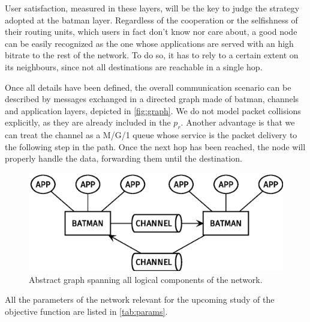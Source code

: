 \documentclass[conference,10.5pt]{IEEEtran}
\begin{document}
User satisfaction, measured in these layers, will be the key to judge the strategy adopted at the \gls{batman} layer.
Regardless of the cooperation or the selfishness of their routing units, which users in fact don't know nor care about, a good node can be easily recognized as the one whose applications are served with an high bitrate to the rest of the network.
To do so, it has to rely to a certain extent on its neighbours, since not all destinations are reachable in a single hop.

\smallskip
Once all details have been defined, the overall communication scenario can be described by messages exchanged in a directed graph made of \gls{batman}, channels and application layers, depicted in \autoref{fig:graph}.
We do not model packet collisions explicitly, as they are already included in the $p_r$. Another advantage is that we can treat the channel as a M/G/1 queue whose service is the packet delivery to the following step in the path.
Once the next hop has been reached, the node will properly handle the data, forwarding them until the destination.

\begin{figure}[h]
  \centering
  \includegraphics[width=\linewidth]{figures/layers_diagram}
  \caption{Abstract graph spanning all logical components of the network.}
  \label{fig:graph}
\end{figure}

All the parameters of the network relevant for the upcoming study of the objective function are listed in \autoref{tab:params}.

\renewcommand\theadalign{l}
\end{document}
